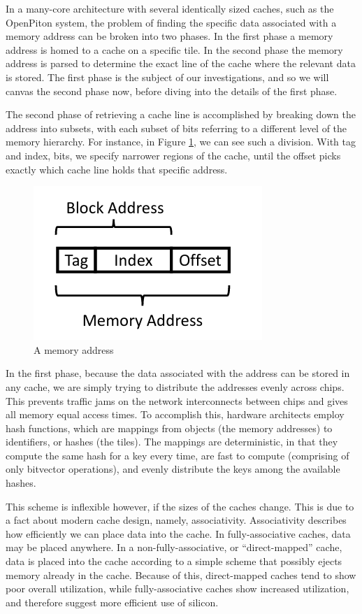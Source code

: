 In a many-core architecture with several identically sized caches, such as the
OpenPiton system, the problem of finding the specific data associated with a
memory address can be broken into two phases.  In the first phase a memory
address is homed to a cache on a specific tile.  In the second phase the memory
address is parsed to determine the exact line of the cache where the relevant
data is stored.  The first phase is the subject of our investigations, and so we
will canvas the second phase now, before diving into the details of the first
phase.

The second phase of retrieving a cache line is accomplished by breaking down the
address into subsets, with each subset of bits referring to a different level of
the memory hierarchy.  For instance, in Figure \ref{Fig:memory_addr}, we can see
such a division.  With tag and index, bits, we specify narrower regions of the
cache, until the offset picks exactly which cache line holds that specific
address.

\begin{figure}[h]
  \centering
  \includegraphics[scale=0.4]{memory_addr.png}
  \caption{A memory address}
  \label{Fig:memory_addr}
\end{figure}

In the first phase, because the data associated with the address can be stored
in any cache, we are simply trying to distribute the addresses evenly across chips.  This prevents traffic jams on the network interconnects between
chips and gives all memory equal access times.  To accomplish this, hardware
architects employ hash functions, which are mappings from objects (the memory
addresses) to identifiers, or hashes (the tiles).  The mappings are
deterministic, in that they compute the same hash for a key every time, are fast
to compute (comprising of only bitvector operations), and evenly distribute the
keys among the available hashes.

This scheme is inflexible however, if the sizes of the caches change.  This is
due to a fact about modern cache design, namely, associativity.  Associativity
describes how efficiently we can place data into the cache.  In
fully-associative caches, data may be placed anywhere.  In a
non-fully-associative, or ``direct-mapped'' cache, data is placed into the cache
according to a simple scheme that possibly ejects memory already in the cache.
Because of this, direct-mapped caches tend to show poor overall utilization,
while fully-associative caches show increased utilization, and therefore suggest
more efficient use of silicon.

